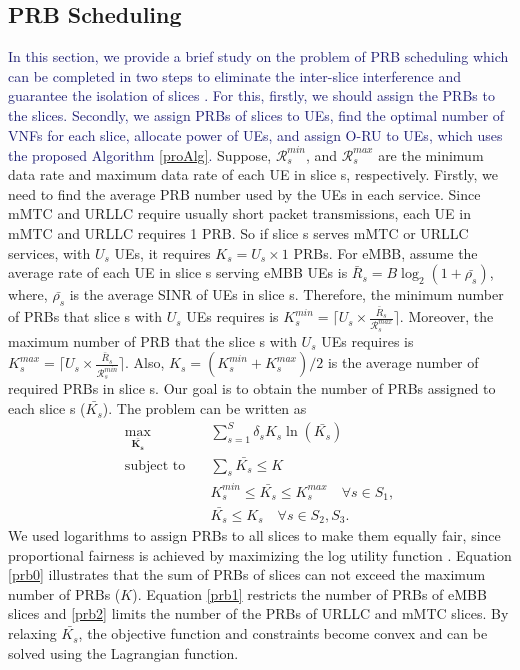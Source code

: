 \documentclass[lettersize,journal]{IEEEtran}
\begin{document}
\subsection{PRB Scheduling}\label{prb}
\textcolor{MidnightBlue}{In this section, we provide a brief study on the problem of PRB scheduling which can be completed in two steps to eliminate the inter-slice interference and guarantee the isolation of slices \cite{marabissi2019highly}.
For this, firstly, we should assign the PRBs to the slices. Secondly, we assign PRBs of slices to UEs, find the optimal number of VNFs for each slice, allocate power of UEs, and assign O-RU to UEs, which uses the proposed Algorithm \ref{proAlg}.}
Suppose, $\mathcal{R}_{{s}}^{min}$, and $\mathcal{R}_{{s}}^{max}$ are the minimum data rate and maximum data rate of each UE in slice s, respectively.
Firstly, we need to find the average PRB number used by the UEs in each service. Since mMTC and URLLC require usually short packet transmissions, each UE in mMTC and URLLC requires 1 PRB. So if slice s serves mMTC or URLLC services, with $U_s$ UEs, it requires $K_s = U_s \times 1$ PRBs. For eMBB, assume the average rate of each UE in slice s serving eMBB UEs is $\bar{R}_s = B\log_2(1 + \bar{\rho_s})$, where, $\bar{\rho_s}$ is the average SINR of UEs in slice s. 
Therefore, the minimum number of PRBs that slice s with $U_s$ UEs requires is $K_s^{min} = \lceil{U_s \times \frac{\bar{R}_s}{\mathcal{R}_{{s}}^{max}}}\rceil$. 
Moreover, the maximum number of PRB that the slice s with $U_s$ UEs requires is $K_s^{max} = \lceil{U_s \times \frac{\bar{R}_s}{\mathcal{R}_{{s}}^{min}}}\rceil$. Also, $K_s = (K_s^{min}+K_s^{max})/2$ is the average number of required PRBs in slice s.
Our goal is to obtain the number of PRBs assigned to each slice s ($\bar{K_s}$).
The problem can be written as
\begin{subequations}\label{prob:prb}
\begin{alignat}{4}
\max\limits_{\boldsymbol{\bar{K_s}}} \quad &  \sum_{s=1}^{S}\delta_s K_s \ln(\bar{K_s}) \ \\
\text{subject to} \quad  & \sum_s{\bar{K_s}} \leq K
 \label{prb0} \\
& K_s^{min} \leq \bar{K_s}  \leq K_s^{max}  \quad \forall s \in S_1,\label{prb1} \\
&  \bar{K_s} \leq K_s  \quad \forall s \in S_2, S_3.\label{prb2}
\end{alignat}
\label{constraints}
\end{subequations}
We used logarithms to assign PRBs to all slices to make them equally fair, since proportional fairness is achieved by maximizing the log utility function \cite{marabissi2019highly}.
Equation \eqref{prb0} illustrates that the sum of PRBs of slices can not exceed the maximum number of PRBs ($K$).
Equation \eqref{prb1} restricts the number of PRBs of eMBB slices and \eqref{prb2} limits the number of the PRBs of URLLC and mMTC slices. By relaxing $\bar{K_s}$, the objective function and constraints become convex and can be solved using the Lagrangian function.
\end{document}
